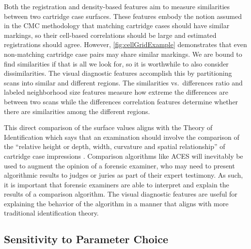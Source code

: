 \documentclass[11pt,]{isuthesis}
\begin{document}
Both the registration and density-based features aim to measure similarities between two cartridge case surfaces.
These features embody the notion assumed in the CMC methodology that matching cartridge cases should have similar markings, so their cell-based correlations should be large and estimated registrations should agree.
However, \ref{fig:cellGridExample} demonstrates that even non-matching cartridge case pairs may share similar markings.
We are bound to find similarities if that is all we look for, so it is worthwhile to also consider dissimilarities.
The visual diagnostic features accomplish this by partitioning scans into similar and different regions.
The similarities vs.~differences ratio and labeled neighborhood size features measure how extreme the differences are between two scans while the differences correlation features determine whether there are similarities among the different regions.

This direct comparison of the surface values aligns with the Theory of Identification which says that an examination should involve the comparison of the ``relative height or depth, width, curvature and spatial relationship'' of cartridge case impressions \citep{AFTE1992}.
Comparison algorithms like ACES will inevitably be used to augment the opinion of a forensic examiner, who may need to present algorithmic results to judges or juries as part of their expert testimony.
As such, it is important that forensic examiners are able to interpret and explain the results of a comparison algorithm.
The visual diagnostic features are useful for explaining the behavior of the algorithm in a manner that aligns with more traditional identification theory.

\hypertarget{sensitivity-to-parameter-choice}{%
\subsection{Sensitivity to Parameter Choice}\label{sensitivity-to-parameter-choice}}
\end{document}
